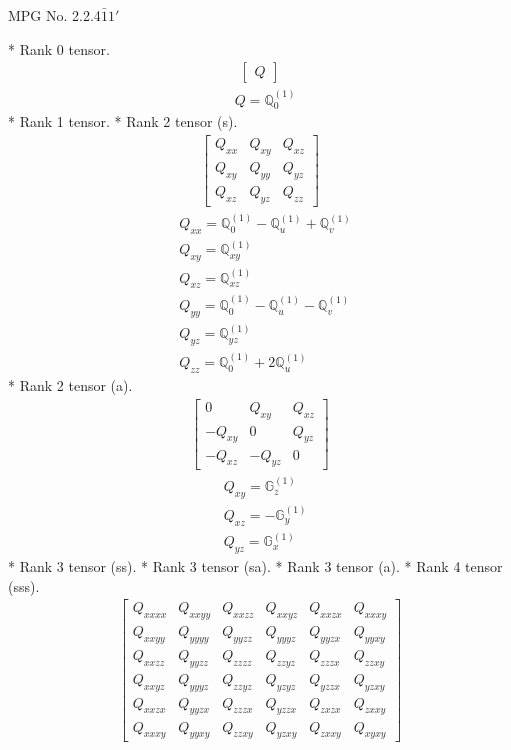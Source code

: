 \documentclass[fleqn,8pt,landscape]{jsarticle}
\begin{document}
\setcounter{MaxMatrixCols}{32}

\renewcommand{\tablename}{Table~}
\renewcommand{\figurename}{Figure~}
\begin{center}
\LARGE
MPG No. 2.2.4\quad$\bar{1}1'$
\end{center}
* Rank 0 tensor.
\begin{align*}
\begin{bmatrix} Q \end{bmatrix}
\end{align*}
\begin{align*}
& Q = \mathbb{Q}_{0}^{(1)}
\end{align*}
* Rank 1 tensor.
* Rank 2 tensor (s).
\begin{align*}
\begin{bmatrix} Q_{xx} & Q_{xy} & Q_{xz} \\ Q_{xy} & Q_{yy} & Q_{yz} \\ Q_{xz} & Q_{yz} & Q_{zz} \end{bmatrix}
\end{align*}
\begin{align*}
& Q_{xx} = \mathbb{Q}_{0}^{(1)} - \mathbb{Q}_{u}^{(1)} + \mathbb{Q}_{v}^{(1)} \\
& Q_{xy} = \mathbb{Q}_{xy}^{(1)} \\
& Q_{xz} = \mathbb{Q}_{xz}^{(1)} \\
& Q_{yy} = \mathbb{Q}_{0}^{(1)} - \mathbb{Q}_{u}^{(1)} - \mathbb{Q}_{v}^{(1)} \\
& Q_{yz} = \mathbb{Q}_{yz}^{(1)} \\
& Q_{zz} = \mathbb{Q}_{0}^{(1)} + 2 \mathbb{Q}_{u}^{(1)}
\end{align*}
* Rank 2 tensor (a).
\begin{align*}
\begin{bmatrix} 0 & Q_{xy} & Q_{xz} \\ - Q_{xy} & 0 & Q_{yz} \\ - Q_{xz} & - Q_{yz} & 0 \end{bmatrix}
\end{align*}
\begin{align*}
& Q_{xy} = \mathbb{G}_{z}^{(1)} \\
& Q_{xz} = - \mathbb{G}_{y}^{(1)} \\
& Q_{yz} = \mathbb{G}_{x}^{(1)}
\end{align*}
* Rank 3 tensor (ss).
* Rank 3 tensor (sa).
* Rank 3 tensor (a).
* Rank 4 tensor (sss).
\begin{align*}
\begin{bmatrix} Q_{xxxx} & Q_{xxyy} & Q_{xxzz} & Q_{xxyz} & Q_{xxzx} & Q_{xxxy} \\ Q_{xxyy} & Q_{yyyy} & Q_{yyzz} & Q_{yyyz} & Q_{yyzx} & Q_{yyxy} \\ Q_{xxzz} & Q_{yyzz} & Q_{zzzz} & Q_{zzyz} & Q_{zzzx} & Q_{zzxy} \\ Q_{xxyz} & Q_{yyyz} & Q_{zzyz} & Q_{yzyz} & Q_{yzzx} & Q_{yzxy} \\ Q_{xxzx} & Q_{yyzx} & Q_{zzzx} & Q_{yzzx} & Q_{zxzx} & Q_{zxxy} \\ Q_{xxxy} & Q_{yyxy} & Q_{zzxy} & Q_{yzxy} & Q_{zxxy} & Q_{xyxy} \end{bmatrix}
\end{align*}
\end{document}
